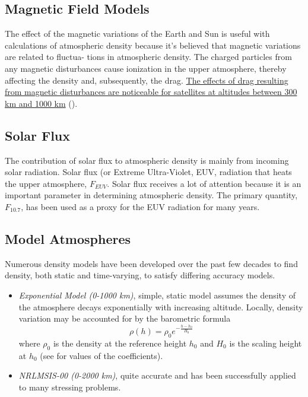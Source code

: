 \subsection{Magnetic Field Models}
The effect of the magnetic variations of the Earth and Sun is useful with calculations of
atmospheric density because it's believed that magnetic variations are related to fluctua-
tions in atmospheric density. The charged particles from any magnetic disturbances cause ionization in the upper atmosphere,
thereby affecting the density and, subsequently, the drag. \ul{The effects of
drag resulting from magnetic disturbances are noticeable for satellites at altitudes
between 300 km and 1000 km} (\cite{Vallado}).

\subsection{Solar Flux}
The contribution of solar flux to atmospheric density is mainly from incoming solar
radiation. Solar flux (or Extreme Ultra-Violet, EUV, radiation that heats the upper
atmosphere, \(F_{EUV}\). Solar flux receives a lot of attention because it is an important parameter in determining
atmospheric density. The primary quantity, \(F_{10.7}\), has been used as a proxy for the EUV
radiation for many years.

\subsection{Model Atmospheres}
Numerous density models have been developed over the past few decades to find density, 
both static and time-varying, to satisfy differing accuracy models.
\begin{itemize}
    \item \emph{Exponential Model (0-1000 km)}, simple, static model assumes the density of the atmosphere decays exponentially
    with increasing altitude. Locally, density variation may be accounted for by the barometric formula
    \begin{equation}
        \rho (h) = {\rho}_0  e^{-\frac{h-h_0}{H_0}}
    \end{equation}
    where \({\rho}_0\) is the density at the reference height \(h_0\) and \(H_0\) 
    is the scaling height at \(h_0\) (see \cite{Vallado} for values of the coefficients).
    \item \emph{NRLMSIS-00 (0-2000 km)}\cite{nrlmsise00}, quite accurate and has 
    been successfully applied to many stressing problems.
\end{itemize}

